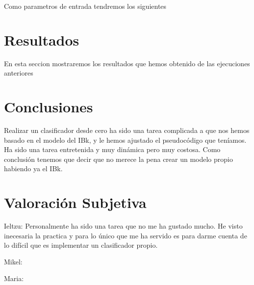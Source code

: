 \documentclass[a4paper,10pt]{article}
\theoremstyle{plain}
\begin{document}
	Como parametros de entrada tendremos los siguientes


\section{Resultados}

En esta seccion mostraremos los resultados que hemos obtenido de las ejecuciones anteriores

\section{Conclusiones}

Realizar un clasificador desde cero ha sido una tarea complicada a que nos hemos basado en el modelo del IBk, y le hemos ajustado el pseudoc\'odigo que ten\'iamos. Ha sido una tarea entretenida y muy din\'amica pero muy costosa. Como conclusi\'on tenemos que decir que no merece la pena crear un modelo propio habiendo ya el IBk.   

\section{Valoraci\'on Subjetiva}

Ieltzu: Personalmente ha sido una tarea que no me ha gustado mucho. He visto inecesaria la practica y para lo \'unico que me ha servido es para darme cuenta de lo dif\'icil que es implementar un clasificador propio. 

Mikel:

Maria:





\end{document}
